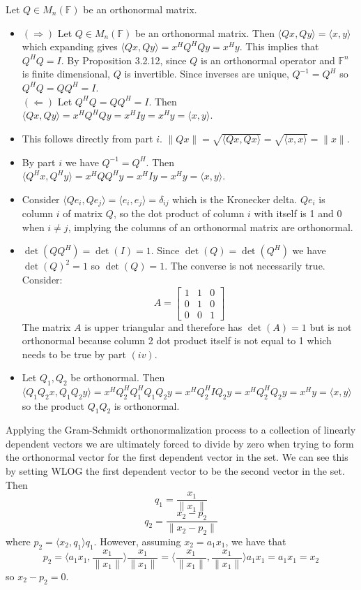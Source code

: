 \documentclass[12pt]{article}
\newenvironment{problem}[2][Problem]{\begin{trivlist}
\item[\hskip \labelsep {\bfseries #1}\hskip \labelsep {\bfseries #2}]}{\end{trivlist}}
\begin{document}
\begin{problem}{10.} Let $Q \in M_n(\mathbb{F})$ be an orthonormal matrix. 
\begin{itemize}
\item [(i)] $(\Rightarrow)$ Let $Q \in M_n(\mathbb{F})$ be an orthonormal matrix. Then $\langle Qx, Qy \rangle  = \langle x,y \rangle$ which expanding gives $\langle Qx, Qy \rangle = x^HQ^HQy = x^Hy$. This implies that $Q^HQ = I$. By Proposition 3.2.12, since $Q$ is an orthonormal operator and $\mathbb{F}^n$ is finite dimensional, $Q$ is invertible. Since inverses are unique,  $Q^{-1}  = Q^H$ so $Q^HQ = QQ^H = I$. \\
$(\Leftarrow)$ Let $Q^HQ = QQ^H = I$. Then $\langle Qx, Qy \rangle = x^HQ^HQy = x^HIy = x^Hy = \langle x,y \rangle$.

\item [(ii)] This follows directly from part $i$. $\|Qx\| = \sqrt{\langle Qx, Qx \rangle} = \sqrt{\langle x, x \rangle} = \|x\|$. 
\item [(iii)] By part $i$ we have $Q^{-1}  = Q^H$. Then $\langle Q^Hx, Q^Hy \rangle = x^HQQ^Hy = x^HIy = x^Hy = \langle x,y \rangle$.
\item [(iv)] Consider $\langle Qe_i, Qe_j \rangle = \langle e_i,e_j \rangle = \delta_{ij}$ which is the Kronecker delta. $Qe_i$ is column $i$ of matrix $Q$, so the dot product of column $i$ with itself is 1 and 0 when $i \neq j$, implying the columns of an orthonormal matrix are orthonormal.  
\item [(v)] $\det(QQ^H) = \det(I) = 1$. Since $\det(Q) = \det(Q^H)$ we have $\det(Q)^2= 1$ so $\det(Q)= 1$. The converse is not necessarily true. Consider: 
\[ A= 
\begin{bmatrix}
    1   & 1 & 0 \\
    0   & 1& 0 \\
    0   & 0 &1 
\end{bmatrix}
\]
The matrix $A$ is upper triangular and therefore has $\det(A) = 1$ but is not orthonormal because column 2 dot product itself is not equal to 1 which needs to be true by part $(iv)$. 
\item [(vi)] Let $Q_1, Q_2$ be orthonormal. Then $\langle Q_1Q_2x, Q_1Q_2y \rangle = x^HQ_2^HQ_1^HQ_1Q_2y = x^HQ_2^HIQ_2y = x^HQ_2^HQ_2y = x^Hy = \langle x ,y \rangle$ so the product $Q_1Q_2$ is orthonormal. 
\end{itemize}
\end{problem}

\begin{problem}{11.} Applying the Gram-Schmidt orthonormalization process to a collection of linearly dependent vectors we are ultimately forced to divide by zero when trying to form the orthonormal vector for the first dependent vector in the set. We can see this by setting WLOG the first dependent vector to be the second vector in the set. Then 
$$q_1 = \frac{x_1}{\|x_1\|}$$
$$q_2 = \frac{x_2 - p_2}{\|x_2 - p_2\|}$$
where $p_2 = \langle x_2, q_1 \rangle q_1$. However, assuming $x_2 = a_1 x_1$, we have that 
$$p_2 =  \langle a_1 x_1,  \frac{x_1}{\|x_1\|} \rangle  \frac{x_1}{\|x_1\|} = \langle   \frac{x_1}{\|x_1\|},  \frac{x_1}{\|x_1\|} \rangle   a_1x_1 = a_1x_1 = x_2$$
so $x_2 - p_2 = 0$. 
\end{problem}
\end{document}
